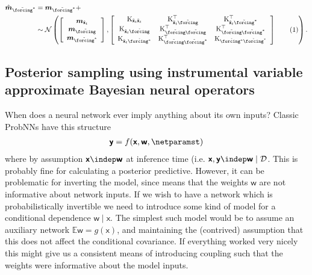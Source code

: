 \documentclass{article}
\newcommand\numberthis{\addtocounter{equation}{1}\tag{\theequation}}
\newcommand{\vv}[1]{\boldsymbol{#1}}
\newcommand{\mm}[1]{\mathrm{#1}}
\newcommand{\rv}[1]{\mathsf{#1}}
\newcommand{\vrv}[1]{\vv{\rv{#1}}}
\newcommand{\dist}[1]{\mathcal{#1}}
\newcommand{\gvn}{\mid}
\newcommand{\Ex}{\mathbb{E}}
\newcommand{\state}{\rv{x}}
\begin{document}
\begin{align*}
\hat{\vv{m}}_{\tilde{\forcing}^{*}} 
&=\vv{m}_{\tilde{\forcing}^{*}} + \\
&\sim\dist{N}\left(
    \left[\begin{array}{c}
        \vv{m}_{\tilde{\vv{\state}}_{t}}\\
        \vv{m}_{\tilde{\forcing}}\\
        \vv{m}_{\tilde{\forcing}^{*}}
    \end{array}\right],
    \left[\begin{array}{ccc}
        \mm{K}_{\tilde{\vv{\state}}_{t}\tilde{\vv{\state}}_{t}}
        & \mm{K}_{\tilde{\vv{\state}}_{t}\tilde{\forcing}}^{\top} 
        & \mm{K}_{\tilde{\vv{\state}}_{t}\tilde{\forcing}^{*}}^{\top} \\ 
          \mm{K}_{\tilde{\vv{\state}}_{t}\tilde{\forcing}}
        & \mm{K}_{\tilde{\forcing}\tilde{\forcing}}^{\top}
        & \mm{K}_{\tilde{\forcing}\tilde{\forcing}^{*}}^{\top} \\
          \mm{K}_{\tilde{\vv{\state}}_{t}\tilde{\forcing^{*}}}
        & \mm{K}_{\tilde{\forcing}\tilde{\forcing}^{*}}^{\top}
        & \mm{K}_{\tilde{\forcing^{*}}\tilde{\forcing}^{*}} \\
    \end{array}\right]\numberthis\label{eq:discrete_joint_naive_sub}
\right).
\end{align*}

\subsection{Posterior sampling using instrumental variable approximate Bayesian neural operators}

When does a neural network ever imply anything about its own inputs?
Classic ProbNNs have this structure
\begin{align*}
    \vrv{y}=f(\vrv{x}, \vrv{w}, \netparamst) 
\end{align*}
where by assumption \(\vrv{x} \indep \vrv{w}\) at inference time (i.e. 
\(\vrv{x},\vrv{y} \indep \vrv{w}\gvn\mathcal{D}\).
This is probably fine for calculating a posterior predictive.
However, it can be problematic for inverting the model, since means that the weights \(\vrv{w}\) are not informative about network inputs.
If we wish to have a network which is probabilistically invertible we need to introduce some kind of model for a conditional dependence \(\vrv{w}\gvn\vrv{x}\).
The simplest such model would be to assume an auxiliary network \(\Ex\vrv{w}=g(\vrv{x})\), and maintaining the (contrived) assumption that this does not affect the conditional covariance.
If everything worked very nicely this might give us a consistent means of introducing coupling such that the weights were informative about the model inputs.
\end{document}
